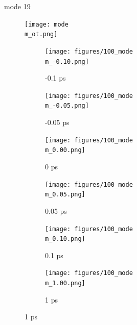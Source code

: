 \documentclass{beamer}
\newcommand\w{0.32}
\begin{document}
\renewcommand\m{19}
\begin{frame}{mode \m}
					\vspace{\vh mm}
	\begin{figure}
		\centering
		\texttt{[image: mode\\m\_ot.png]}
	\end{figure}
	\begin{figure}
		\centering
		\begin{subfigure}[b]{\w\textwidth}
			\centering
			\texttt{[image: figures/100\_mode\\m\_-0.10.png]}
			\caption{-0.1 ps}
		\end{subfigure}
		\begin{subfigure}[b]{\w\textwidth}
			\centering
			\texttt{[image: figures/100\_mode\\m\_-0.05.png]}
			\caption{-0.05 ps}
		\end{subfigure}
		\begin{subfigure}[b]{\w\textwidth}
			\centering
			\texttt{[image: figures/100\_mode\\m\_0.00.png]}
			\caption{0 ps}
		\end{subfigure}
		\begin{subfigure}[b]{\w\textwidth}
			\centering
			\texttt{[image: figures/100\_mode\\m\_0.05.png]}
			\caption{0.05 ps}
		\end{subfigure}
		\begin{subfigure}[b]{\w\textwidth}
			\centering
			\texttt{[image: figures/100\_mode\\m\_0.10.png]}
			\caption{0.1 ps}
		\end{subfigure}
		\begin{subfigure}[b]{\w\textwidth}
			\centering
			\texttt{[image: figures/100\_mode\\m\_1.00.png]}
			\caption{1 ps}
		\end{subfigure}
	\end{figure}
\end{frame}
\end{document}
